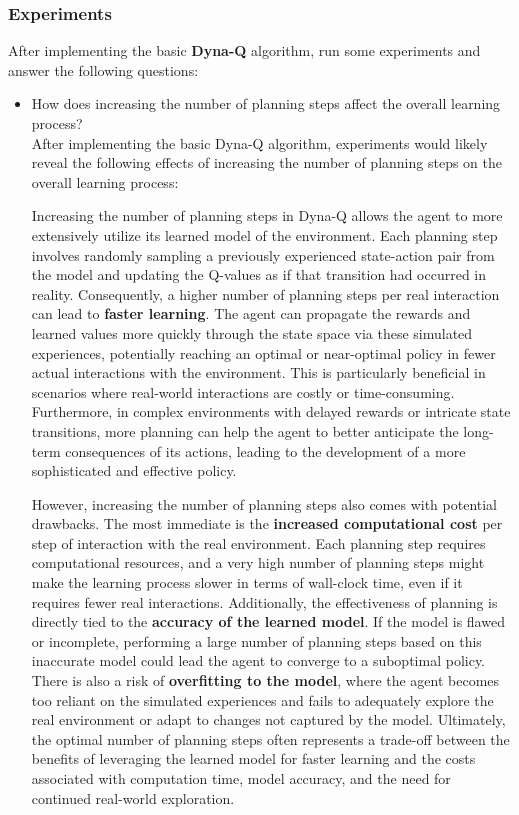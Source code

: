 \subsubsection{Experiments}
After implementing the basic \textbf{Dyna-Q} algorithm, run some experiments and answer the following questions:
\begin{itemize} 
    \item How does increasing the number of planning steps affect the overall learning process? 
    \\
    After implementing the basic Dyna-Q algorithm, experiments would likely reveal the following effects of increasing the number of planning steps on the overall learning process:

Increasing the number of planning steps in Dyna-Q allows the agent to more extensively utilize its learned model of the environment. Each planning step involves randomly sampling a previously experienced state-action pair from the model and updating the Q-values as if that transition had occurred in reality. Consequently, a higher number of planning steps per real interaction can lead to \textbf{faster learning}. The agent can propagate the rewards and learned values more quickly through the state space via these simulated experiences, potentially reaching an optimal or near-optimal policy in fewer actual interactions with the environment. This is particularly beneficial in scenarios where real-world interactions are costly or time-consuming. Furthermore, in complex environments with delayed rewards or intricate state transitions, more planning can help the agent to better anticipate the long-term consequences of its actions, leading to the development of a more sophisticated and effective policy.

However, increasing the number of planning steps also comes with potential drawbacks. The most immediate is the \textbf{increased computational cost} per step of interaction with the real environment. Each planning step requires computational resources, and a very high number of planning steps might make the learning process slower in terms of wall-clock time, even if it requires fewer real interactions. Additionally, the effectiveness of planning is directly tied to the \textbf{accuracy of the learned model}. If the model is flawed or incomplete, performing a large number of planning steps based on this inaccurate model could lead the agent to converge to a suboptimal policy. There is also a risk of \textbf{overfitting to the model}, where the agent becomes too reliant on the simulated experiences and fails to adequately explore the real environment or adapt to changes not captured by the model. Ultimately, the optimal number of planning steps often represents a trade-off between the benefits of leveraging the learned model for faster learning and the costs associated with computation time, model accuracy, and the need for continued real-world exploration.


\end{itemize}
